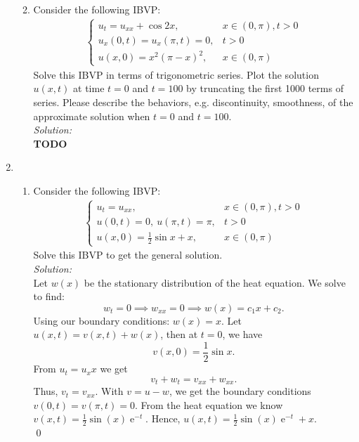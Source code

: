 \documentclass[10pt]{amsart}
\DeclareMathOperator{\E}{e}
\theoremstyle{nonumberplain}
\begin{document}
\begin{enumerate}[label={\bf {\arabic*}:}]
\begin{enumerate}
\newpage


\item Consider the following IBVP:
\begin{align*}
\begin{cases}
u_t = u_{xx} + \cos 2x, &x \in (0, \pi), t > 0 \\
u_x(0, t) = u_x(\pi, t) = 0, & t > 0 \\
u(x, 0) = x^2(\pi - x)^2, &x \in (0, \pi)
\end{cases}
\end{align*}
Solve this IBVP in terms of trigonometric series.
Plot the solution $u(x, t)$ at time $t=0$ and $t=100$ by truncating the first 1000 terms of series.
Please describe the behaviors, e.g. discontinuity, smoothness, of the approximate solution when $t=0$ and $t=100$. \\

\noindent
\textit{Solution:} \\
\textbf{TODO} \\

\end{enumerate}

\newpage

\item
\begin{enumerate}
\item Consider the following IBVP:
\begin{align*}
\begin{cases}
u_t = u_{xx}, &x \in (0, \pi), t > 0 \\
u(0, t) = 0, \: u(\pi, t) = \pi, & t > 0 \\
u(x, 0) = \frac 1 2 \sin x + x, &x \in (0, \pi)
\end{cases}
\end{align*}
Solve this IBVP to get the general solution. \\

\noindent
\textit{Solution:} \\
Let $w(x)$ be the stationary distribution of the heat equation.
We solve to find:
$$
w_t = 0 \implies w_{xx} = 0 \implies w(x) = c_1x + c_2.
$$
Using our boundary conditions: $w(x) = x$.
Let $u(x, t) = v(x, t) + w(x)$, then at $t=0$, we have
$$
v(x, 0) = \frac 1 2 \sin x.
$$
From $u_t = u_xx$ we get
$$
v_t + w_t = v_{xx} + w_{xx}.
$$
Thus, $v_t = v_{xx}$.
With $v = u - w$, we get the boundary conditions $v(0, t) = v(\pi, t) = 0$.
From the heat equation we know
$ v(x, t) = \frac 1 2 \sin(x) \E^{-t}. $
Hence, $u(x, t) = \frac 1 2 \sin(x)\E^{-t} + x. $ \\
\qed \\


\end{enumerate}
\end{enumerate}
\end{document}
